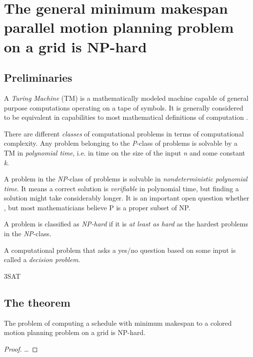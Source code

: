 \section{The general minimum makespan parallel motion planning problem on a grid is NP-hard}

\cite{siamcomp/DemaineFKMS19} \cite{corr/YuL15c}

\subsection{Preliminaries}

A \emph{Turing Machine} (TM) is a mathematically modeled machine capable of general purpose computations operating on a tape of symbols. It is generally considered to be equivalent in capabilities to most mathematical definitions of computation \cite{aw/HopcroftU79}.

There are different \emph{classes} of computational problems in terms of computational complexity. Any problem belonging to the \emph{P}-class of problems is solvable by a TM in \emph{polynomial time}, i.e. in  time on the size of the input \emph{n} and some constant \emph{k}.

A problem in the \emph{NP}-class of problems is solvable in \emph{nondeterministic polynomial time}. It means a correct solution is \emph{verifiable} in polynomial time, but finding a solution might take considerably longer. It is an important open question whether , but most mathematicians believe P is a proper subset of NP.


\begin{definition}
	A problem is classified as \emph{NP-hard} if it is \emph{at least as hard} as the hardest problems in the \emph{NP}-class. 
\end{definition}

A computational problem that asks a yes/no question based on some input is called a \emph{decision problem}.

\begin{definition}
	3SAT
\end{definition}

\subsection{The theorem}

\begin{theorem}
	The problem of computing a schedule with minimum makespan to a colored motion planning problem on a grid is NP-hard.
\end{theorem}

\begin{proof}
	\dots
\end{proof}
